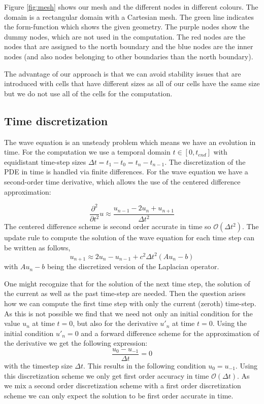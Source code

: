 \documentclass[fleqn,12pt]{NTFD} %
\begin{document}
Figure \ref{fig:mesh} shows our mesh and the different nodes in different colours. The domain is a rectangular domain with a Cartesian mesh. The green line indicates the form-function which shows the given geometry. The purple nodes show the dummy nodes, which are not used in the computation. The red nodes are the nodes that are assigned to the north boundary and the blue nodes are the inner nodes (and also nodes belonging to other boundaries than the north boundary). 

The advantage of our approach is that we can avoid stability issues that are introduced with cells that have different sizes as all of our cells have the same size but we do not use all of the cells for the computation.
\subsection{Time discretization}
The wave equation is an unsteady problem which means we have an evolution in time. For the computation we use a temporal domain $t \in [0, t_{end}]$ with equidistant time-step sizes $\Delta t = t_1 - t_0 = t_n - t_{n-1}$.
The discretization of the PDE in time is handled via finite differences. For the wave equation we have a second-order time derivative, which allows the use of the centered difference approximation:

\begin{equation}
\frac{\partial^2}{\partial t^2} u \approx \frac{u_{n-1} - 2u_n + u_{n+1}}{\Delta t^2}
\end{equation}
The centered difference scheme is second order accurate in time so $\mathcal{O}(\Delta t^2)$.
The update rule to compute the solution of the wave equation for each time step can be written as follows,
\begin{equation}
u_{n+1} \approx 2u_n - u_{n-1} + c^2 \Delta t^2 (Au_n -b)
\end{equation}
with $Au_n-b$ being the discretized version of the Laplacian operator.

One might recognize that for the solution of the next time step, the solution of the current as well as the past time-step are needed. Then the question arises how we can compute the first time step with only the current (zeroth) time-step. As this is not possible we find that we need not only an initial condition for the value $u_n$ at time $t = 0$, but also for the derivative $u'_n$ at time $t = 0$. Using the initial condition $u'_n = 0$ and a forward difference scheme for the approximation of the derivative we get the following expression:
\begin{equation}
    \frac{u_0 - u_{-1}}{\Delta t} = 0
\end{equation} 
with the timestep size $\Delta t$.
This results in the following condition $u_0 = u_{-1}$. Using this discretization scheme we only get first order accuracy in time $\mathcal{O}(\Delta t)$. As we mix a second order discretization scheme with a first order discretization scheme we can only expect the solution to be first order accurate in time.
\end{document}
